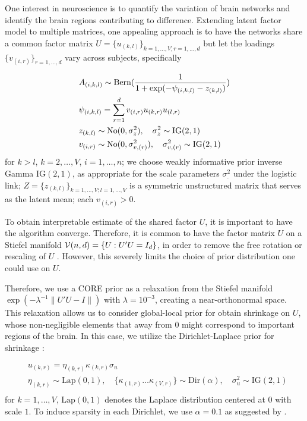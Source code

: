 \documentclass[10pt,fleqn]{article}
\DeclareMathOperator{\1}{\mathbbm{1}} \DeclareMathOperator{\bigO}{\mc O}
\begin{document}
One interest in neuroscience is to quantify the variation of brain networks and
identify the brain regions contributing to difference. Extending latent factor
model to multiple matrices, one appealing approach is to have the networks share
a common factor matrix $U=\{u_{(k,l)}\}_{k=1,\ldots,V;r=1,\ldots,d}$ but let the
loadings $\{ v_{(i,r)}\}_{r=1,\ldots,d}$ vary across subjects, specifically

\begin{equation*} \begin{aligned}
& A_{(i,k,l)} \sim \text{Bern}( \frac{1}{1+ \exp(-\psi_{(i,k,l)}-
z_{(k,l)})})                                                             \\ & \psi_{(i,k,l)} = \sum_{r=1}^{d}  v_{(i,r)} u_{(k,r)}
u_{(l,r)}                                                                \\
& z_{(k,l)} \sim \operatorname{No}(0,\sigma^2_z),\quad  \sigma^2_z\sim \text{IG}(2,1) \\
& v_{(i,r)} \sim \operatorname{No}(0,\sigma^2_{v,(r)}), \quad
\sigma^2_{v,(r)} \sim \text{IG}(2,1)
\end{aligned} \end{equation*}
for
$k>l$, $k=2,\ldots, V$, $i=1,\ldots,n$;  we choose weakly informative prior inverse
Gamma $\text{IG}(2,1)$, as appropriate for the scale parameters $\sigma^2_.$ under the logistic
link; $Z=\{z_{(k,l)}\}_{k=1,\ldots,V;l=1,\ldots,V}$ is a symmetric unstructured
matrix that serves as the latent mean; each $v_{(i,r)}>0$.

To obtain interpretable estimate of the shared factor $U$, it is important to
have the algorithm converge. Therefore, it is common 
to have the factor matrix $U$ on a Stiefel
manifold $\mathcal{V}(n,d)=\{U: U'U=I_d\}$, in order to remove the free rotation or
rescaling of $U$ \citep{hoff2016equivariant}. However, this severely limits the
choice of prior distribution one could use on $U$.

Therefore, we use a CORE prior as a relaxation from the Stiefel manifold $\exp(
- \lambda^{-1} \|U'U-I\|)$ with $\lambda=10^{-3}$, creating a near-orthonormal space. This relaxation allows us to
consider global-local prior for obtain shrinkage on $U$, whose non-negligible
elements that away from $0$ might correspond to important regions of the brain. In this case,
we utilize the Dirichlet-Laplace prior for shrinkage \citep{bhattacharya2015dirichlet}:

\begin{equation*} \begin{aligned}
& u_{(k,r)}= \eta_{(k,r)}\kappa_{(k,r)}\sigma_{u} \\
&
\eta_{(k,r)}\sim \text{Lap}(0,1), \quad \{\kappa_{(1,r)}\ldots
\kappa_{(V,r)}\} \sim \text{Dir}(\alpha), \quad \sigma^2_{u}\sim
\text{IG}(2,1)                                     \\\end{aligned} \end{equation*}
for $k=1,\ldots, V$,  $\text{Lap}(0,1)$ denotes the
Laplace distribution centered at $0$ with scale $1$. To induce sparsity in each Dirichlet, we use $\alpha=0.1$ as
suggested by \cite{bhattacharya2015dirichlet}. 
\end{document}
